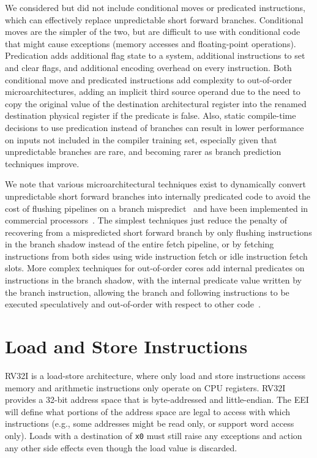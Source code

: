 \begin{commentary}
We considered but did not include conditional moves or predicated
instructions, which can effectively replace unpredictable short
forward branches.  Conditional moves are the simpler of the two, but
are difficult to use with conditional code that might cause exceptions
(memory accesses and floating-point operations).  Predication adds
additional flag state to a system, additional instructions to set and
clear flags, and additional encoding overhead on every instruction.
Both conditional move and predicated instructions add complexity to
out-of-order microarchitectures, adding an implicit third source
operand due to the need to copy the original value of the destination
architectural register into the renamed destination physical register
if the predicate is false.  Also, static compile-time decisions to use
predication instead of branches can result in lower performance on
inputs not included in the compiler training set, especially given
that unpredictable branches are rare, and becoming rarer as branch
prediction techniques improve.

We note that various microarchitectural techniques exist to
dynamically convert unpredictable short forward branches into
internally predicated code to avoid the cost of flushing pipelines on
a branch mispredict~\cite{heil-tr1996,Klauser-1998,Kim-micro2005} and
have been implemented in commercial processors~\cite{ibmpower7}.
The simplest techniques just reduce the penalty of recovering from a
mispredicted short forward branch by only flushing instructions in the
branch shadow instead of the entire fetch pipeline, or by fetching
instructions from both sides using wide instruction fetch or idle
instruction fetch slots.  More complex techniques for out-of-order
cores add internal predicates on instructions in the branch shadow,
with the internal predicate value written by the branch instruction,
allowing the branch and following instructions to be executed
speculatively and out-of-order with respect to other code~\cite{ibmpower7}.
\end{commentary}

\section{Load and Store Instructions}

RV32I is a load-store architecture, where only load and store
instructions access memory and arithmetic instructions only operate on
CPU registers.  RV32I provides a 32-bit address space that is
byte-addressed and little-endian.  The EEI will
define what portions of the address space are legal to access with
which instructions (e.g., some addresses might be read only, or
support word access only).  Loads with a destination of {\tt x0} must
still raise any exceptions and action any other side effects even
though the load value is discarded.

